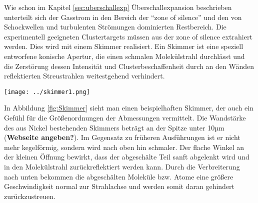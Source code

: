 Wie schon im Kapitel \ref{sec:uberschallexp} Überschallexpansion beschrieben unterteilt sich der Gasstrom in den Bereich der \enquote{zone of silence} und den von Schockwellen und turbulenten Strömungen dominierten Restbereich. Die experimentell geeigneten Clustertargets müssen aus der zone of silence extrahiert werden. Dies wird mit einem Skimmer realisiert. Ein Skimmer ist eine speziell entworfene konische Apertur, die einen schmalen Molekülstrahl durchlässt und die Zerstörung dessen Intensität und Clusterbeschaffenheit durch an den Wänden reflektierten Streustrahlen weitestgehend verhindert. 
\begin{center}
\begin{minipage}{\linewidth}
\centering
\texttt{[image: ../skimmer1.png]}%
 \label{fig:Skimmer}
\end{minipage} 
\end{center} 
In Abbildung \ref{fig:Skimmer} sieht man einen beispielhaften Skimmer, der auch ein Gefühl für die Größenordnungen der Abmessungen vermittelt. Die Wandstärke des aus Nickel bestehenden Skimmers beträgt an der Spitze unter 10µm (\textbf{Webseite angeben?}). Im Gegensatz zu früheren Ausführungen ist er nicht mehr kegelförmig, sondern wird nach oben hin schmaler. Der flache Winkel an der kleinen Öffnung bewirkt, dass der abgeschälte Teil sanft abgelenkt wird und in den Molekülstrahl zurückreflektiert werden kann. Durch die Verbreiterung nach unten bekommen die abgeschälten Moleküle bzw. Atome eine größere Geschwindigkeit normal zur Strahlachse und werden somit daran gehindert zurückzustreuen.

